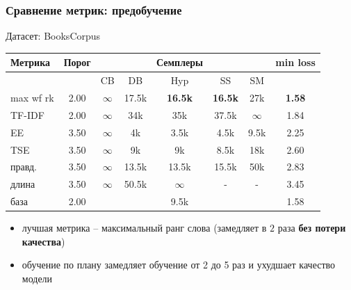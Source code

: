 \documentclass{beamer}
\begin{document}
\begin{frame}
	\frametitle{Сравнение метрик: предобучение}
	\let\thefootnote\relax{}
	
	Датасет: BooksCorpus
	
	\begin{table}
		\begin{tabular}{|l|c|ccccc|c|}
			\hline
			Метрика & Порог & & & Семплеры & & & min loss \\
			\hline
			& & CB & DB & Hyp & SS & SM & \\
			\hline
			max wf rk & 2.00 & $\infty$ & 17.5k & {\bf 16.5k} & {\bf 16.5k} & 27k & {\bf 1.58} \\
			TF-IDF & 2.00 & $\infty$ & 34k & 35k & 37.5k & $\infty$ & 1.84 \\
			\hline
			\hline
			EE & 3.50 & $\infty$ & 4k & 3.5k & 4.5k & 9.5k & 2.25 \\
			TSE & 3.50 & $\infty$ & 9k & 9k & 8.5k & 18k & 2.60 \\
			правд. & 3.50 & $\infty$ & 13.5k & 13.5k & 15.5k & 50k & 2.83 \\
			длина & 3.50 & $\infty$ & 50.5k & $\infty$ & - & - & 3.45 \\
			\hline
			база & 2.00 & & & 9.5k & & & 1.58 \\
			\hline
		\end{tabular}
	\end{table}
	\begin{itemize}
		\item лучшая метрика -- максимальный ранг слова (замедляет в $2$ раза  {\bf без потери качества})
		\item обучение по плану замедляет обучение от 2 до 5 раз и ухудшает качество модели
	\end{itemize}
\end{frame}
\end{document}
